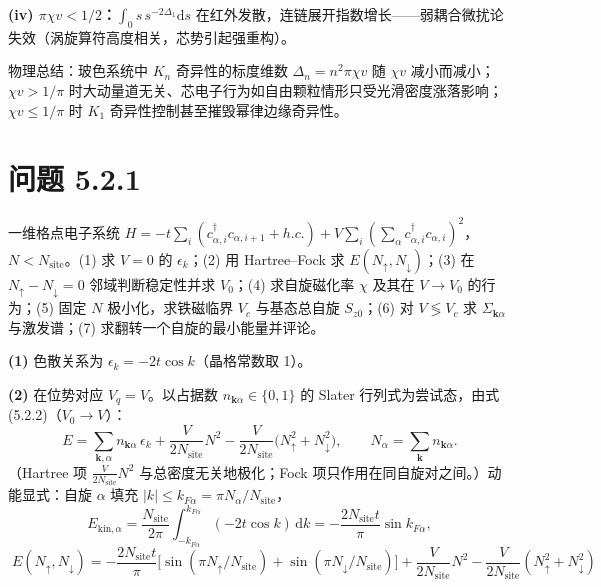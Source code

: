 \textbf{(iv) $\pi\chi v<1/2$：}$\int_0 s\,s^{-2\Delta_1}\mathrm{d}s$ 在红外发散，连链展开指数增长——弱耦合微扰论失效（涡旋算符高度相关，芯势引起强重构）。

物理总结：玻色系统中 $K_n$ 奇异性的标度维数 $\Delta_n=n^{2}\pi\chi v$ 随 $\chi v$ 减小而减小；$\chi v>1/\pi$ 时大动量道无关、芯电子行为如自由颗粒情形只受光滑密度涨落影响；$\chi v\leq1/\pi$ 时 $K_1$ 奇异性控制甚至摧毁幂律边缘奇异性。

\section*{问题 5.2.1}
\begin{problem}
一维格点电子系统 $H=-t\sum_i(c^{\dagger}_{\alpha,i}c_{\alpha,i+1}+h.c.)+V\sum_i(\sum_\alpha c^{\dagger}_{\alpha,i}c_{\alpha,i})^{2}$，$N<N_{\mathrm{site}}$。(1) 求 $V=0$ 的 $\epsilon_k$；(2) 用 Hartree--Fock 求 $E(N_{\uparrow},N_{\downarrow})$；(3) 在 $N_{\uparrow}-N_{\downarrow}=0$ 邻域判断稳定性并求 $V_0$；(4) 求自旋磁化率 $\chi$ 及其在 $V\to V_0$ 的行为；(5) 固定 $N$ 极小化，求铁磁临界 $V_c$ 与基态总自旋 $S_{z0}$；(6) 对 $V\lessgtr V_c$ 求 $\Sigma_{\pmb{k}\alpha}$ 与激发谱；(7) 求翻转一个自旋的最小能量并评论。
\end{problem}
\solution

\textbf{(1)} 色散关系为 $\epsilon_k=-2t\cos k$（晶格常数取 1）。

\textbf{(2)} 在位势对应 $V_q=V$。以占据数 $n_{\pmb{k}\alpha}\in\{0,1\}$ 的 Slater 行列式为尝试态，由式 (5.2.2)（$V_0\to V$）：
\begin{equation*}
E=\sum_{\pmb{k},\alpha}n_{\pmb{k}\alpha}\,\epsilon_k
+\frac{V}{2N_{\mathrm{site}}}N^{2}
-\frac{V}{2N_{\mathrm{site}}}\big(N_{\uparrow}^{2}+N_{\downarrow}^{2}\big),
\qquad N_\alpha=\sum_{\pmb{k}}n_{\pmb{k}\alpha}.
\end{equation*}
（Hartree 项 $\frac{V}{2N_{\mathrm{site}}}N^{2}$ 与总密度无关地极化；Fock 项只作用在同自旋对之间。）动能显式：自旋 $\alpha$ 填充 $|k|\leq k_{F\alpha}=\pi N_\alpha/N_{\mathrm{site}}$，
\begin{equation*}
E_{\mathrm{kin},\alpha}=\frac{N_{\mathrm{site}}}{2\pi}\int_{-k_{F\alpha}}^{k_{F\alpha}}(-2t\cos k)\,\mathrm{d}k
=-\frac{2N_{\mathrm{site}}t}{\pi}\sin k_{F\alpha},
\end{equation*}
\begin{equation*}
\boxed{\;E(N_{\uparrow},N_{\downarrow})=-\frac{2N_{\mathrm{site}}t}{\pi}\big[\sin(\pi N_{\uparrow}/N_{\mathrm{site}})+\sin(\pi N_{\downarrow}/N_{\mathrm{site}})\big]
+\frac{V}{2N_{\mathrm{site}}}N^{2}-\frac{V}{2N_{\mathrm{site}}}(N_{\uparrow}^{2}+N_{\downarrow}^{2})\;}
\end{equation*}

